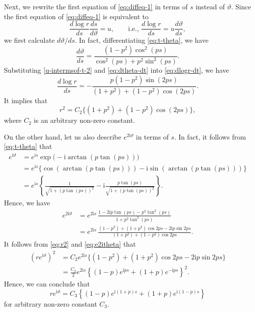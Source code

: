 \documentclass[a4paper]{amsart}
\theoremstyle{plain}
\theoremstyle{remark}
\numberwithin{equation}{section}
\begin{document}
Next, we rewrite the first equation of \eqref{eq:diffeq-1} 
in terms of $s$ instead of $\vartheta$. 
Since the first equation of \eqref{eq:diffeq-1} is 
equivalent to 
\begin{equation}\label{eq:dlogr-dt}
 \frac{d \log r}{ds} \frac{ds}{d \vartheta} = u, \qquad
  \text{i.e., }
 \frac{d \log r}{ds} = u\frac{d \vartheta}{ds},  
\end{equation} 
we first calculate $d \vartheta /ds$. In fact, differentiating 
\eqref{eq:t-theta}, we have
\begin{equation}\label{eq:dtheta-dt}
 \frac{d \vartheta}{ds} = 
\frac{(1-p^2) \cos^2(ps)}{\cos^2(ps)+p^2 \sin^2(ps)}.
\end{equation} 
Substituting \eqref{u-intermsof-t-2} and \eqref{eq:dtheta-dt} into 
\eqref{eq:dlogr-dt}, we have
\begin{equation}
 \frac{d \log r}{ds} = -
\frac{p(1-p^2) \sin (2ps)}{(1+p^2)+(1-p^2) \cos (2ps)}. 
\end{equation}
It implies that 
\begin{equation}\label{eq:r2}
 r^2 = C_2 \{ (1+p^2)+(1-p^2) \cos (2ps) \},
\end{equation}
where $C_2$ is an arbitrary non-zero constant. 

On the other hand, let us also describe $e^{2{\mathrm{i}} \vartheta}$ 
in terms of $s$. In fact, it follows from 
\eqref{eq:t-theta} that 
\begin{align*}
  e^{{\mathrm{i}} \vartheta} 
 &= e^{{\mathrm{i}} s} \exp\bigl(-{\mathrm{i}} \arctan(p \tan (ps)) \bigr)\\
 &= e^{{\mathrm{i}} s} \{ \cos \left( \arctan(p \tan (ps)) \right) 
         - {\mathrm{i}} \sin \left( \arctan (p \tan (ps)) \right) \} \\
 &= e^{{\mathrm{i}} s} \left\{ 
       \frac{1}{\sqrt{1+(p \tan (ps))^2}}
      - {\mathrm{i}} \frac{p \tan (ps)}{\sqrt{1+(p \tan (ps))^2}}
     \right\}.
\end{align*}
Hence, we have 
\begin{align}\label{eq:e2itheta}
  e^{2 {\mathrm{i}} \vartheta} &= e^{2 {\mathrm{i}} s} \, 
    \frac{1 -2 {\mathrm{i}} p \tan (ps) - p^2 \tan^2 (ps)}
         {1+p^2 \tan^2 (ps)} \\
  &= e^{2 {\mathrm{i}} s} \, \frac{(1-p^2)+(1+p^2)\cos 2ps -2{\mathrm{i}} p \sin 2ps}  {(1+p^2)+(1-p^2) \cos 2ps}. 
 \nonumber
\end{align} 
It follows from \eqref{eq:r2} and \eqref{eq:e2itheta} that 
\begin{align*}
 (r e^{{\mathrm{i}} \vartheta})^2 
   &= C_2 e^{2 {\mathrm{i}} s} \{ (1-p^2)+(1+p^2)\cos 2ps -2{\mathrm{i}} p \sin 2ps \} \\
   &= \frac{C_2}{2} e^{2 {\mathrm{i}} s}
          \left\{ 
            (1-p) e^{{\mathrm{i}} ps} + (1+p) e^{- {\mathrm{i}} ps}
          \right\}^2 . 
\end{align*}
Hence, we can conclude that 
\begin{equation*}
 r e^{{\mathrm{i}} \vartheta} 
   = C_3 
   \left\{ 
    (1-p) e^{{\mathrm{i}} (1+p)s} + (1+p) e^{ {\mathrm{i}} (1-p)s}
   \right\}
\end{equation*}
for arbitrary non-zero constant $C_3$. 
\end{document}
